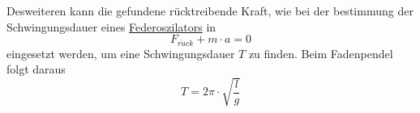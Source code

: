\documentclass{article}
\begin{document}
Desweiteren kann die gefundene rücktreibende Kraft, wie bei der bestimmung der Schwingungsdauer eines \hyperref[Federoszilatoren]{Federoszilators} in
\[
 F_{r\ddot{u}ck} + m \cdot a = 0
\] 
eingesetzt werden, um eine Schwingungsdauer $T$ zu finden. Beim Fadenpendel folgt daraus
\[
 \boxed{
  T = 2\pi \cdot \sqrt{\frac{l}{g}}
 } 
\] 
\end{document}
